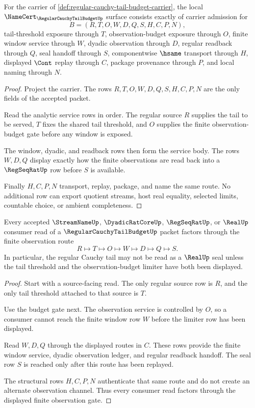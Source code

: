 \begin{theorem}
\label{thm:regular-cauchy-tail-budget-namecert-obligations}
For the carrier of \autoref{def:regular-cauchy-tail-budget-carrier}, the local $\NameCert_{\RegularCauchyTailBudgetUp}$ surface consists exactly of carrier admission for
$$
B=(R,T,O,W,D,Q,S,H,C,P,N),
$$
tail-threshold exposure through $T$, observation-budget exposure through $O$, finite window service through $W$, dyadic observation through $D$, regular readback through $Q$, seal handoff through $S$, componentwise $\hsame$ transport through $H$, displayed $\Cont$ replay through $C$, package provenance through $P$, and local naming through $N$.
\end{theorem}
\begin{proof}
Project the carrier. The rows $R,T,O,W,D,Q,S,H,C,P,N$ are the only fields of the accepted packet.

Read the analytic service rows in order. The regular source $R$ supplies the tail to be served, $T$ fixes the shared tail threshold, and $O$ supplies the finite observation-budget gate before any window is exposed.

The window, dyadic, and readback rows then form the service body. The rows $W,D,Q$ display exactly how the finite observations are read back into a $\RegSeqRatUp$ row before $S$ is available.

Finally $H,C,P,N$ transport, replay, package, and name the same route. No additional row can export quotient streams, host real equality, selected limits, countable choice, or ambient completeness.
\end{proof}

\begin{theorem}
\label{thm:regular-cauchy-tail-budget-observation-gate}
Every accepted $\StreamNameUp$, $\DyadicRatCoreUp$, $\RegSeqRatUp$, or $\RealUp$ consumer read of a $\RegularCauchyTailBudgetUp$ packet factors through the finite observation route
$$
R \longmapsto T \longmapsto O \longmapsto W \longmapsto D \longmapsto Q \longmapsto S.
$$
In particular, the regular Cauchy tail may not be read as a $\RealUp$ seal unless the tail threshold and the observation-budget limiter have both been displayed.
\end{theorem}
\begin{proof}
Start with a source-facing read. The only regular source row is $R$, and the only tail threshold attached to that source is $T$.

Use the budget gate next. The observation service is controlled by $O$, so a consumer cannot reach the finite window row $W$ before the limiter row has been displayed.

Read $W,D,Q$ through the displayed routes in $C$. These rows provide the finite window service, dyadic observation ledger, and regular readback handoff. The seal row $S$ is reached only after this route has been replayed.

The structural rows $H,C,P,N$ authenticate that same route and do not create an alternate observation channel. Thus every consumer read factors through the displayed finite observation gate.
\end{proof}

